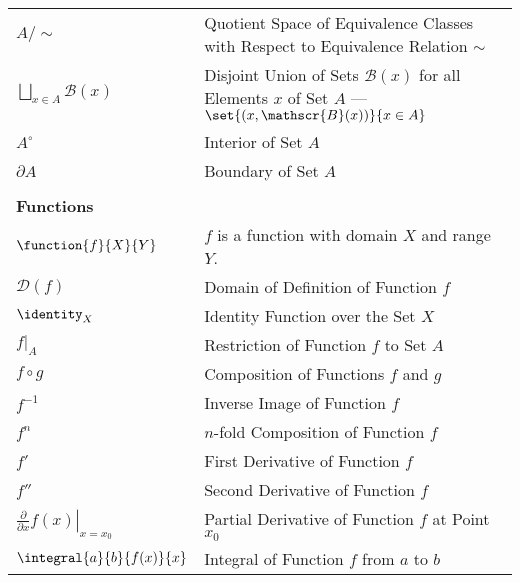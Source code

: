 \documentclass[crop=false,10pt,ngerman]{standalone}
\begin{document}
{\begin{tabularx}{\textwidth}{p{}p{}}
      $A/\sim$ & Quotient Space of Equivalence Classes with Respect to Equivalence Relation $\sim$ \\

      $\bigsqcup_{x\in A} \mathscr{B}(x)$ & Disjoint Union of Sets $\mathscr{B}(x)$ for all Elements $x$ of Set $A$ --- $\set{(x,\mathscr{B}(x))}{x\in A}$ \\

      $A^\circ$ & Interior of Set $A$ \\
      $\partial A$ & Boundary of Set $A$ \\

      \\
      \hline
      \textbf{Functions} & \\
      $\function{f}{X}{Y}$ & $f$ is a function with domain $X$ and range $Y$. \\
      $\mathscr{D}(f)$ & Domain of Definition of Function $f$ \\
      $\identity_X$ & Identity Function over the Set $X$ \\
      $f|_A$ & Restriction of Function $f$ to Set $A$ \\
      $f\circ g$ & Composition of Functions $f$ and $g$ \\
      $f^{-1}$ & Inverse Image of Function $f$ \\
      $f^n$ & $n$-fold Composition of Function $f$ \\
      $f'$ & First Derivative of Function $f$ \\
      $f''$ & Second Derivative of Function $f$ \\
      $\left.\frac{\partial}{\partial x}f(x)\right|_{x=x_0}$ & Partial Derivative of Function $f$ at Point $x_0$ \\
      $\integral{a}{b}{f(x)}{x}$ & Integral of Function $f$ from $a$ to $b$ \\


\end{tabularx}}
\end{document}
